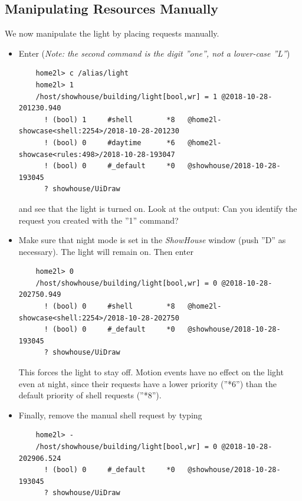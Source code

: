 \documentclass[12pt,english,parskip=half]{scrreprt}
\begin{document}
\subsection{Manipulating Resources Manually}
\label{sec:tutorial-shell-manipulate}


We now manipulate the light by placing requests manually.

\begin{itemize}[$\blacktriangleright$]

\item
  Enter (\emph{Note: the second command is the digit ''one'', not a
  lower-case ''L''})
  \begin{lstlisting}
    home2l> c /alias/light
    home2l> 1
    /host/showhouse/building/light[bool,wr] = 1 @2018-10-28-201230.940
      ! (bool) 1     #shell        *8   @home2l-showcase<shell:2254>/2018-10-28-201230
      ! (bool) 0     #daytime      *6   @home2l-showcase<rules:498>/2018-10-28-193047
      ! (bool) 0     #_default     *0   @showhouse/2018-10-28-193045
      ? showhouse/UiDraw
  \end{lstlisting}
  and see that the light is turned on. Look at the output: Can you
  identify the request you created with the ''1'' command?

\item
  Make sure that night mode is set in the \emph{ShowHouse} window (push ''D'' as necessary). The
  light will remain on. Then enter
  \begin{lstlisting}
    home2l> 0
    /host/showhouse/building/light[bool,wr] = 0 @2018-10-28-202750.949
      ! (bool) 0     #shell        *8   @home2l-showcase<shell:2254>/2018-10-28-202750
      ! (bool) 0     #_default     *0   @showhouse/2018-10-28-193045
      ? showhouse/UiDraw
  \end{lstlisting}
  This forces the light to stay off. Motion events have no effect on the
  light even at night, since their requests have a lower priority
  (''*6'') than the default priority of shell requests (''*8'').

\item
  Finally, remove the manual shell request by typing
  \begin{lstlisting}
    home2l> -
    /host/showhouse/building/light[bool,wr] = 0 @2018-10-28-202906.524
      ! (bool) 0     #_default     *0   @showhouse/2018-10-28-193045
      ? showhouse/UiDraw
  \end{lstlisting}

\end{itemize}
\end{document}
